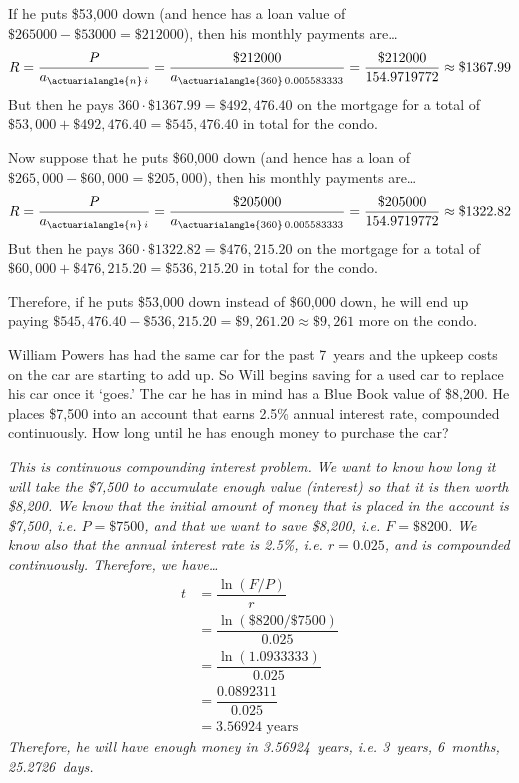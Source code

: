 \documentclass[12pt,letterpaper]{exam}
\begin{document}
\begin{questions}
{If he puts \$53,000 down (and hence has a loan value of $\$265000 - \$53000= \$212000$), then his monthly payments are\dots
	\[
	R= \dfrac{P}{a_{\actuarialangle{n}\,i}}= \dfrac{\$212000}{a_{\actuarialangle{360}\,0.005583333}}= \dfrac{\$212000}{154.9719772} \approx \$1367.99
	\]
But then he pays $360 \cdot \$1367.99= \$492,476.40$ on the mortgage for a total of $\$53,000 + \$492,476.40= \$545,476.40$ in total for the condo. \pspace

Now suppose that he puts \$60,000 down (and hence has a loan of $\$265,000 - \$60,000= \$205,000$), then his monthly payments are\dots
	\[
	R= \dfrac{P}{a_{\actuarialangle{n}\,i}}= \dfrac{\$205000}{a_{\actuarialangle{360}\,0.005583333}}= \dfrac{\$205000}{154.9719772} \approx \$1322.82
	\]
But then he pays $360 \cdot \$1322.82= \$476,215.20$ on the mortgage for a total of $\$60,000 + \$476,215.20= \$536,215.20$ in total for the condo. \pspace

Therefore, if he puts \$53,000 down instead of \$60,000 down, he will end up paying $\$545,476.40 - \$536,215.20= \$9,261.20 \approx \$9,261$ more on the condo. 
}



\newpage
\question[10] William Powers has had the same car for the past 7~years and the upkeep costs on the car are starting to add up. So Will begins saving for a used car to replace his car once it `goes.' The car he has in mind has a Blue Book value of \$8,200. He places \$7,500 into an account that earns 2.5\% annual interest rate, compounded continuously. How long until he has enough money to purchase the car? \pspace

{\itshape
\sol This is continuous compounding interest problem. We want to know how long it will take the \$7,500 to accumulate enough value (interest) so that it is then worth \$8,200. We know that the initial amount of money that is placed in the account is \$7,500, i.e. $P= \$7500$, and that we want to save \$8,200, i.e. $F= \$8200$. We know also that the annual interest rate is 2.5\%, i.e. $r= 0.025$, and is compounded continuously. Therefore, we have\dots
	\[
	\begin{aligned}
	t&= \dfrac{\ln(F/P)}{r} \\[0.3cm]
	&= \dfrac{\ln(\$8200/\$7500)}{0.025} \\[0.3cm]
	&= \dfrac{\ln(1.0933333)}{0.025} \\[0.3cm]
	&= \dfrac{0.0892311}{0.025} \\[0.3cm]
	&= 3.56924 \text{ years}
	\end{aligned}
	\]
Therefore, he will have enough money in 3.56924~years, i.e. 3~years, 6~months, 25.2726~days. 
}




\end{questions}
\end{document}
